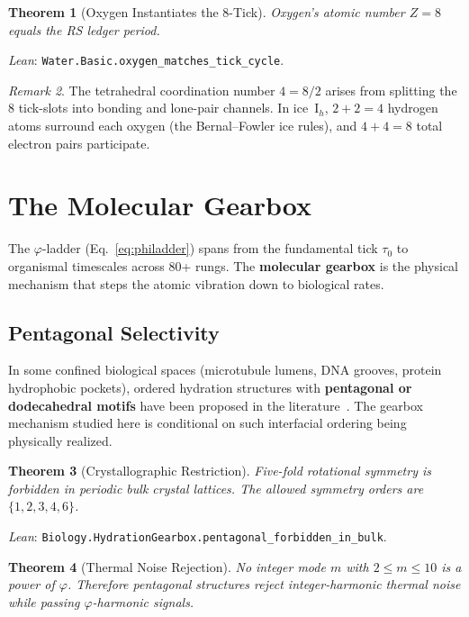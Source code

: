 \documentclass[12pt,a4paper]{article}
\newtheorem{theorem}{Theorem}[section]
\theoremstyle{definition}
\theoremstyle{remark}
\newtheorem{remark}[theorem]{Remark}
\begin{document}
\begin{theorem}[Oxygen Instantiates the 8-Tick]
Oxygen's atomic number $Z = 8$ equals the RS ledger period.
\end{theorem}

\noindent
\textit{Lean}: \texttt{Water.Basic.oxygen\_matches\_tick\_cycle}.

\begin{remark}
The tetrahedral coordination number $4 = 8/2$ arises from splitting
the 8 tick-slots into bonding and lone-pair channels.  In ice~I$_h$,
$2 + 2 = 4$ hydrogen atoms surround each oxygen (the Bernal--Fowler
ice rules), and $4 + 4 = 8$ total electron pairs participate.
\end{remark}

\section{The Molecular Gearbox}
\label{sec:gearbox}

The $\varphi$-ladder (Eq.~\ref{eq:philadder}) spans from the
fundamental tick $\tau_0$ to organismal timescales across 80+ rungs.
The \textbf{molecular gearbox} is the physical mechanism that steps
the atomic vibration down to biological rates.

\subsection{Pentagonal Selectivity}

In some confined biological spaces (microtubule lumens, DNA grooves,
protein hydrophobic pockets), ordered hydration structures with
\textbf{pentagonal or dodecahedral motifs} have been proposed in the
literature~\cite{Pollack2013}.  The gearbox mechanism studied here is
conditional on such interfacial ordering being physically realized.

\begin{theorem}[Crystallographic Restriction]
\label{thm:cryst_restriction}
Five-fold rotational symmetry is forbidden in periodic bulk crystal
lattices.  The allowed symmetry orders are $\{1, 2, 3, 4, 6\}$.
\end{theorem}

\noindent
\textit{Lean}: \texttt{Biology.HydrationGearbox.pentagonal\_forbidden\_in\_bulk}.

\begin{theorem}[Thermal Noise Rejection]
\label{thm:noise_rejection}
No integer mode $m$ with $2 \leq m \leq 10$ is a power of $\varphi$.
Therefore pentagonal structures reject integer-harmonic thermal noise
while passing $\varphi$-harmonic signals.
\end{theorem}
\end{document}
